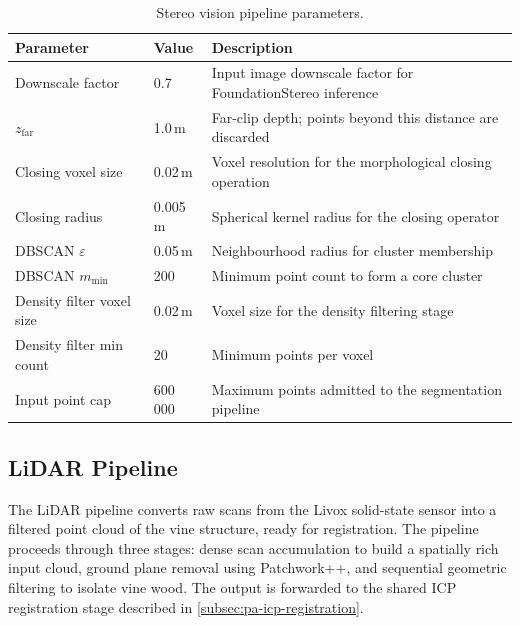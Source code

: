 \begin{table}[htbp]
  \centering
  \caption{Stereo vision pipeline parameters.}
  \label{tab:pa-stereo-params}
  \begin{tabularx}{\textwidth}{l l X}
    \toprule
    \textbf{Parameter} & \textbf{Value} & \textbf{Description} \\
    \midrule
    Downscale factor          & 0.7        & Input image downscale factor for FoundationStereo inference \\
    $z_\mathrm{far}$          & 1.0\,m     & Far-clip depth; points beyond this distance are discarded \\
    Closing voxel size        & 0.02\,m    & Voxel resolution for the morphological closing operation \\
    Closing radius            & 0.005\,m   & Spherical kernel radius for the closing operator \\
    DBSCAN $\varepsilon$      & 0.05\,m    & Neighbourhood radius for cluster membership \\
    DBSCAN $m_\mathrm{min}$   & 200        & Minimum point count to form a core cluster \\
    Density filter voxel size & 0.02\,m    & Voxel size for the density filtering stage \\
    Density filter min count  & 20         & Minimum points per voxel \\
    Input point cap           & 600\,000   & Maximum points admitted to the segmentation pipeline \\
    \bottomrule
  \end{tabularx}
\end{table}

\subsection{LiDAR Pipeline}
\label{subsec:pa-lidar-pipeline}

The LiDAR pipeline converts raw scans from the Livox solid-state sensor into a filtered point cloud of the vine structure, ready for registration. The pipeline proceeds through three stages: dense scan accumulation to build a spatially rich input cloud, ground plane removal using Patchwork++, and sequential geometric filtering to isolate vine wood. The output is forwarded to the shared ICP registration stage described in \cref{subsec:pa-icp-registration}.

